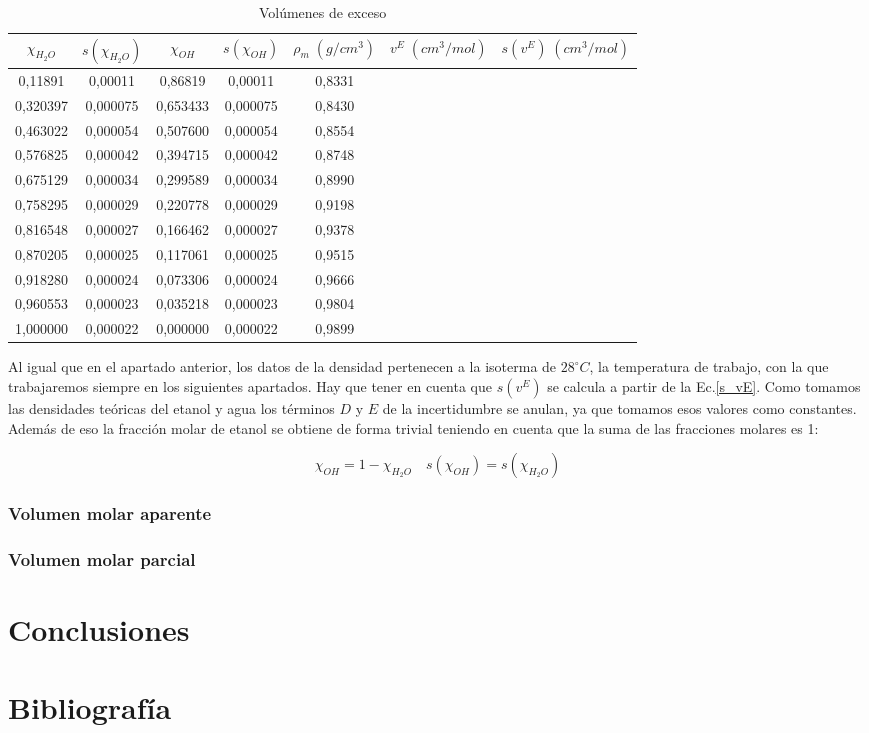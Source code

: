 \documentclass[a4paper,12pt,titlepage]{article}
\begin{document}
\begin{table}[h!]
\centering
\begin{tabular}{|c|c|c|c|c|c|c|}
\hline
$\chi_{H_2O}$ & $s(\chi_{H_2O})$ & $\chi_{OH}$ & $s(\chi_{OH})$ & $\rho_m \;(g/cm^{3})$ & $v^{E} \;(cm^3/ mol)$ & $s(v^{E}) \;(cm^3/ mol)$ \\ \hline
0,11891       & 0,00011            &  0,86819 & 0,00011        & 0,8331 &  &  \\ \hline
0,320397      & 0,000075           &  0,653433  & 0,000075       &  0,8430 &  &  \\ \hline
0,463022      & 0,000054           &  0,507600 & 0,000054       &  0,8554  &  &  \\ \hline
0,576825      & 0,000042           & 0,394715 & 0,000042       &   0,8748  &  &  \\ \hline
0,675129      & 0,000034           & 0,299589 & 0,000034       &   0,8990  &  &  \\ \hline
0,758295      & 0,000029           &  0,220778  & 0,000029       &  0,9198  &  &  \\ \hline
0,816548      & 0,000027           & 0,166462 & 0,000027       &   0,9378  &  &  \\ \hline
0,870205      & 0,000025           &  0,117061 & 0,000025       &  0,9515  &  &  \\ \hline
0,918280      & 0,000024           &  0,073306 & 0,000024       &  0,9666   &  &  \\ \hline
0,960553      & 0,000023           & 0,035218 & 0,000023       &   0,9804  &  &  \\ \hline
1,000000      & 0,000022           &  0,000000 & 0,000022       &   0,9899 &  &  \\ \hline
\end{tabular}
\caption{Volúmenes de exceso}
\label{tab:my-table}
\end{table}

Al igual que en el apartado anterior, los datos de la densidad pertenecen a la isoterma de $28^{\circ}C$, la temperatura de trabajo, con la que trabajaremos siempre en los siguientes apartados. Hay que tener en cuenta que $s(v^{E})$ se calcula a partir de la Ec.\ref{s_vE}. Como tomamos las densidades teóricas del etanol y agua los términos $D$ y $E$ de la incertidumbre se anulan, ya que tomamos esos valores como constantes. Además de eso la fracción molar de etanol se obtiene de forma trivial teniendo en cuenta que la suma de las fracciones molares es 1:

\begin{equation}
    \chi_{OH} = 1-\chi_{H_2O} \quad s(\chi_{OH}) = s(\chi_{H_2O})
\end{equation}

\subsubsection{Volumen molar aparente}

\subsubsection{Volumen molar parcial}

\section{Conclusiones}

\section{Bibliografía}
\end{document}
